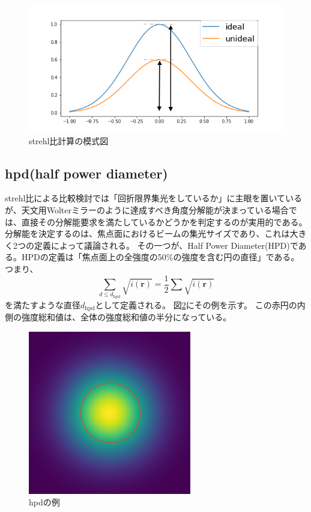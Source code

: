 \documentclass[dvipdfmx,autodetect-engine]{jreport}
\begin{document}
\begin{figure}[h!]
\centering
\includegraphics[scale=0.6]{images/error_simulation/explanation/strehl.png}
\caption{strehl比計算の模式図}
\label{fig:strehl_explanation}
\end{figure}

\subsection{hpd(half power diameter)}
strehl比による比較検討では「回折限界集光をしているか」に主眼を置いているが、天文用Wolterミラーのように達成すべき角度分解能が決まっている場合では、直接その分解能要求を満たしているかどうかを判定するのが実用的である。
分解能を決定するのは、焦点面におけるビームの集光サイズであり、これは大きく2つの定義によって議論される。
その一つが、Half Power Diameter(HPD)である。HPDの定義は「焦点面上の全強度の50\%の強度を含む円の直径」である。つまり、
\[
    \sum_{d\leq d_{\mathrm{hpd}}} \sqrt{ i(\mathbf{r}) } = \frac{1}{2} \sum \sqrt{ i(\mathbf{r}) }
\]
を満たすような直径$d_{\mathrm{hpd}}$として定義される。
図\ref{fig:hpd_explanation}にその例を示す。
この赤円の内側の強度総和値は、全体の強度総和値の半分になっている。

\begin{figure}[h!]
\centering
\includegraphics[scale=0.6]{images/error_simulation/explanation/hpd.png}
\caption{hpdの例}
\label{fig:hpd_explanation}
\end{figure}
\end{document}
